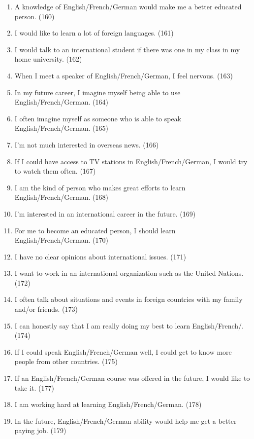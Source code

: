\documentclass[output=paper]{langsci/langscibook}
\begin{document}
\begin{enumerate}
\item  A knowledge of {English}/French/{German} would make me a better educated person. (160)
\item  I would like to learn a lot of foreign languages. (161)
\item  I would talk to an international student if there was one in my class in my home university. (162)
\item  When I meet a speaker of {English}/French/{German}, I feel nervous. (163)
\item  In my future career, I imagine myself being able to use {English}/French/{German}. (164)
\item  I often imagine myself as someone who is able to speak {English}/French/{German}. (165)
\item  I'm not much interested in overseas news. (166)
\item  If I could have access to TV stations in {English}/French/{German}, I would try to watch them often. (167)
\item  I am the kind of person who makes great efforts to learn {English}/French/{German}. (168)
\item  I'm interested in an international career in the future. (169)
\item  For me to become an educated person, I should learn {English}/French/{German}. (170)
\item  I have no clear opinions about international issues. (171)
\item  I want to work in an international organization such as the United Nations. (172)
\item  I often talk about situations and events in foreign countries with my family and/or friends. (173)
\item  I can honestly say that I am really doing my best to learn {English}/French/. (174)
\item  If I could speak {English}/French/{German} well, I could get to know more people from other countries. (175) 
\item { If an {English}/French/{German} course was offered in the future, I would like to take it. (177)}
\item  I am working hard at learning {English}/French/{German}. (178)
\item  In the future, {English}/French/{German} ability would help me get a better paying job. (179)
\end{enumerate}
\end{document}
